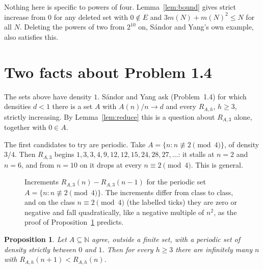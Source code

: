 \documentclass[11pt]{amsart}
\newtheorem{proposition}[theorem]{Proposition}
\theoremstyle{remark}
\newcommand{\N}{\mathbb{N}}
\begin{document}
Nothing here is specific to powers of four. Lemma~\ref{lem:bound} gives strict increase from $0$ for any deleted set with $0\notin E$ and $3m(N)+m(N)^2\le N$ for all $N$. Deleting the powers of two from $2^{10}$ on, Sándor and Yang's own example, also satisfies this.

\section{Two facts about Problem 1.4}\label{sec:periodic}

The sets above have density $1$. Sándor and Yang ask (Problem~1.4) for which densities $d<1$ there is a set $A$ with $A(n)/n\to d$ and every $R_{A,h}$, $h\ge3$, strictly increasing. By Lemma~\ref{lem:reduce} this is a question about $R_{A,3}$ alone, together with $0\in A$.

The first candidates to try are periodic. Take $A=\{n: n\not\equiv2\pmod 4\}$, of density $3/4$. Then $R_{A,3}$ begins $1,3,3,4,9,12,12,15,24,28,27,\dots$: it stalls at $n=2$ and $n=6$, and from $n=10$ on it drops at every $n\equiv2\pmod4$. This is general.

\begin{figure}[ht]
\centering
{}
\caption{Increments $R_{A,3}(n)-R_{A,3}(n-1)$ for the periodic set $A=\{n:n\not\equiv2\pmod4\}$. The increments differ from class to class, and on the class $n\equiv2\pmod4$ (the labelled ticks) they are zero or negative and fall quadratically, like a negative multiple of $n^{2}$, as the proof of Proposition~\ref{prop:periodic} predicts.}
\label{fig:periodic}
\end{figure}

\begin{proposition}\label{prop:periodic}
Let $A\subseteq\N$ agree, outside a finite set, with a periodic set of density strictly between $0$ and $1$. Then for every $h\ge3$ there are infinitely many $n$ with $R_{A,h}(n+1)<R_{A,h}(n)$.
\end{proposition}
\end{document}
